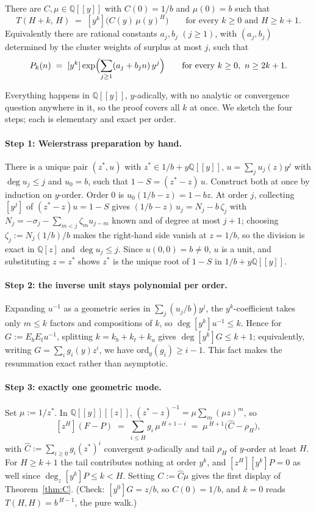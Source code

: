 \documentclass[11pt]{article}
\newcommand{\Q}{\mathbb{Q}}
\begin{document}
\begin{theorem}
\label{thm:C}
There are $C, \mu \in \Q[[y]]$ with $C(0) = 1/b$ and $\mu(0) = b$ such that
\[
  T(H+k,\,H) \;=\; [y^k]\bigl(C(y)\,\mu(y)^{H}\bigr)
  \qquad\text{for every } k \ge 0 \text{ and } H \ge k+1 .
\]
Equivalently there are rational constants $a_j, b_j$ $(j \ge 1)$, with
$(a_j,b_j)$ determined by the cluster weights of surplus at most $j$, such that
\[
  P_k(n) \;=\; [y^k]\exp\Bigl(\sum_{j \ge 1} (a_j + b_j n)\, y^{j}\Bigr)
  \qquad\text{for every } k \ge 0,\ n \ge 2k+1 .
\]
\end{theorem}

Everything happens in $\Q[[y]]$, $y$-adically, with no analytic or convergence
question anywhere in it, so the proof covers all $k$ at once. We
sketch the four steps; each is elementary and exact per order.

\paragraph{Step 1: Weierstrass preparation by hand.} There is a unique pair
$(z^*, u)$ with $z^* \in 1/b + y\Q[[y]]$, $u = \sum_j u_j(z) y^j$ with
$\deg u_j \le j$ and $u_0 = b$, such that $1 - S = (z^* - z)\,u$. Construct both
at once by induction on $y$-order. Order $0$ is $u_0(1/b - z) = 1 - bz$. At order
$j$, collecting $[y^j]$ of $(z^*-z)u = 1-S$ gives
$(1/b - z)\,u_j = N_j - b\,\zeta_j$ with
$N_j = -\sigma_j - \sum_{m<j}\zeta_m u_{j-m}$ known and of degree at most $j+1$;
choosing $\zeta_j := N_j(1/b)/b$ makes the right-hand side vanish at $z = 1/b$,
so the division is exact in $\Q[z]$ and $\deg u_j \le j$. Since $u(0,0) = b \ne 0$,
$u$ is a unit, and substituting $z = z^*$ shows $z^*$ is the unique root of
$1-S$ in $1/b + y\Q[[y]]$.

\paragraph{Step 2: the inverse unit stays polynomial per order.} Expanding
$u^{-1}$ as a geometric series in $\sum_j (u_j/b)y^j$, the $y^k$-coefficient
takes only $m \le k$ factors and compositions of $k$, so
$\deg [y^k]u^{-1} \le k$. Hence for $G := E_b E_t u^{-1}$, splitting
$k = k_b + k_t + k_u$ gives $\deg [y^k]G \le k+1$; equivalently, writing
$G = \sum_i g_i(y) z^i$, we have $\mathrm{ord}_y(g_i) \ge i-1$. This fact makes the
resummation exact rather than asymptotic.

\paragraph{Step 3: exactly one geometric mode.} Set $\mu := 1/z^*$. In
$\Q[[y]][[z]]$, $(z^*-z)^{-1} = \mu\sum_m (\mu z)^m$, so
\[
  [z^H](F - P) \;=\; \sum_{i \le H} g_i\, \mu^{\,H+1-i}
  \;=\; \mu^{\,H+1}\bigl(\hat C - \rho_H\bigr),
\]
with $\hat C := \sum_{i \ge 0} g_i (z^*)^i$ convergent $y$-adically and tail
$\rho_H$ of $y$-order at least $H$. For $H \ge k+1$ the tail contributes nothing
at order $y^k$, and $[z^H][y^k]P = 0$ as well since $\deg_z [y^k]P \le k < H$.
Setting $C := \hat C \mu$ gives the first display of Theorem~\ref{thm:C}. (Check:
$[y^0]G = z/b$, so $C(0) = 1/b$, and $k=0$ reads $T(H,H) = b^{\,H-1}$, the pure
walk.)
\end{document}
